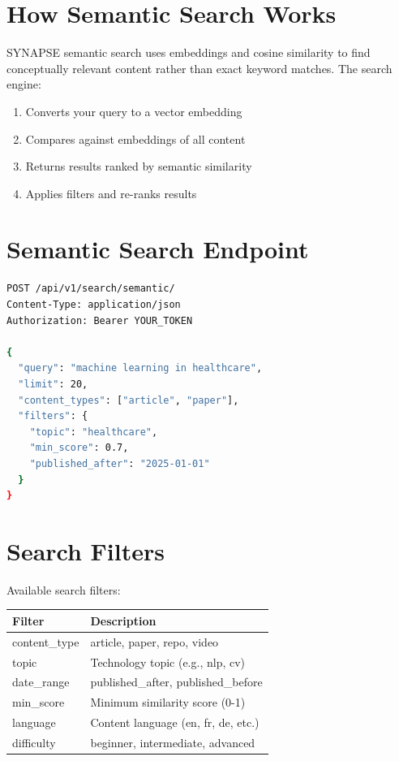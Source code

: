 \documentclass{report}
\begin{document}
\section{How Semantic Search Works}

SYNAPSE semantic search uses embeddings and cosine similarity to find conceptually relevant content rather than exact keyword matches. The search engine:

\begin{enumerate}
    \item Converts your query to a vector embedding
    \item Compares against embeddings of all content
    \item Returns results ranked by semantic similarity
    \item Applies filters and re-ranks results
\end{enumerate}

\section{Semantic Search Endpoint}

\begin{lstlisting}[language=bash]
POST /api/v1/search/semantic/
Content-Type: application/json
Authorization: Bearer YOUR_TOKEN

{
  "query": "machine learning in healthcare",
  "limit": 20,
  "content_types": ["article", "paper"],
  "filters": {
    "topic": "healthcare",
    "min_score": 0.7,
    "published_after": "2025-01-01"
  }
}
\end{lstlisting}

\section{Search Filters}

Available search filters:

\begin{center}
\begin{tabular}{lp{4cm}}
\toprule
\textbf{Filter} & \textbf{Description} \\
\midrule
content\_type & article, paper, repo, video \\
topic & Technology topic (e.g., nlp, cv) \\
date\_range & published\_after, published\_before \\
min\_score & Minimum similarity score (0-1) \\
language & Content language (en, fr, de, etc.) \\
difficulty & beginner, intermediate, advanced \\
\bottomrule
\end{tabular}
\end{center}
\end{document}
